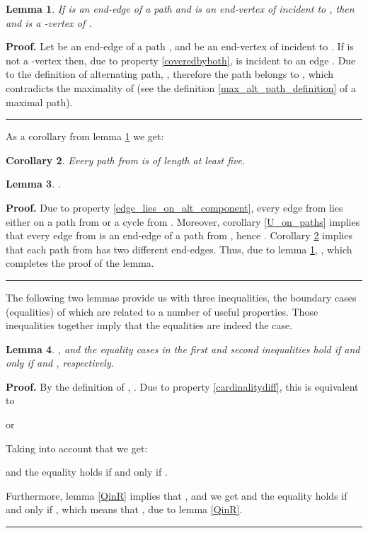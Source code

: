 \documentclass[a4paper, 12pt]{article}
\newtheorem{lemma}{Lemma}[subsection]
\newtheorem{corollary}[lemma]{Corollary}
\newenvironment{proof}[1][Proof]{\noindent\textbf{#1.} }{\ \rule{0.5em}{0.5em}}
\begin{document}
\begin{lemma} \label{S_on_U}
If  is an end-edge of a path  and  is an
end-vertex of  incident to , then  and  is a
-vertex of .
\end{lemma}
\begin{proof}
Let  be an end-edge of a path , and  be an end-vertex of  incident to . If 
is not a -vertex then, due to property \ref{coveredbyboth}, 
is incident to an edge . Due to the definition of
alternating path, , therefore the path  belongs to , which contradicts the maximality of
 (see the definition \ref{max_alt_path_definition} of a maximal
path).
\end{proof}

\bigskip

As a corollary from lemma \ref{S_on_U} we get:
\begin{corollary}\label{odd_S_paths_length}
Every path from  is of length at least five.
\end{corollary}

\begin{lemma}\label{cardinality_ScapU}
.
\end{lemma}
\begin{proof}
Due to property \ref{edge_lies_on_alt_component}, every edge from  lies either on a path from  or a cycle from
. Moreover, corollary \ref{U_on_paths} implies that every
edge from  is an end-edge of a path from
, hence . Corollary \ref{odd_S_paths_length} implies that
each path from  has two different end-edges. Thus, due
to lemma \ref{S_on_U}, , which completes the proof of the
lemma.
\end{proof}

\bigskip

The following two lemmas provide us with three inequalities, the
boundary cases (equalities) of which are related to a number of
useful properties. Those inequalities together imply that the
equalities are indeed the case.

\begin{lemma}\label{balance_upper_bound}
, and the equality cases in the
first and second inequalities hold if and only if  and
, respectively.
\end{lemma}
\begin{proof}
By the definition of , . Due to property \ref{cardinalitydiff}, this is
equivalent to

or

Taking into account that  we get:

and the equality holds if and only if .

Furthermore, lemma \ref{QinR} implies that , and we
get
 and the equality holds if and only if , which means that , due to lemma \ref{QinR}.
\end{proof}
\end{document}

